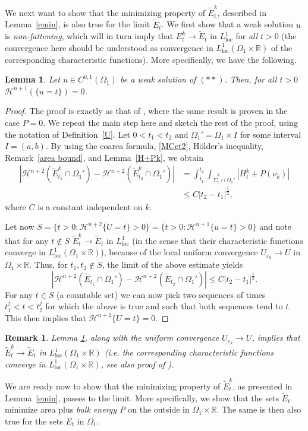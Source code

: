 \documentclass[11pt]{amsart}
\newtheorem{Lemma}[Theorem]{Lemma}
\newtheorem{Remark}[Theorem]{Remark}
\renewcommand{\epsilon}{\varepsilon}
\def\R{\mathbb{R}}
\def\e{\epsilon}
\def\H{\mathcal{H}}
\def\wt{\widetilde}
\def\loc{\text{loc}}
\begin{document}
We next want to show that the minimizing property of $\wt E_t^k$, described in Lemma~\ref{emin}, is also true for the limit $\wt E_t$. We first show that a weak solution $u$ is {\it non-fattening}, which will in turn imply that $E_t^k\to \wt E_t$ in $L^1_\loc$ for {\it all} $t>0$ (the convergence here should be understood as convergence in $L^1_\loc(\Omega_1\times\R)$ of the corresponding characteristic functions). More specifically, we have the following.
\begin{Lemma}\label{nonfat} Let $u\in C^{0,1}(\Omega_1)$ be a weak solution of $(**)$. Then, for all $t>0$ $\H^{n+1}(\{u=t\})=0$.
\end{Lemma}
\begin{proof}
The proof is exactly as that of \cite[Lemma 5.5]{S08}, where the same result is proven in the case $P=0$. We repeat the main step here and sketch the rest of the proof, using the notation of Definition~\ref{U}. Let $0<t_1<t_2$ and $\Omega_1'=\Omega_1\times I$ for some interval $I=(a,b)$. By using the coarea formula, \eqref{MCet2}, H\"older's inequality, Remark~\ref{area bound}, and Lemma~\ref{H+Pk}, we obtain
\[\begin{split}
|\H^{n+2}(\wt E_{t_1}^k\cap\Omega_1')-\H^{n+2}(\wt E_{t_2}^k\cap\Omega_1')|&=\int_{t_1}^{t_2}\int_{\wt\Sigma^k_t\cap\Omega_1'}|H_t^k+P(\nu_k)|\\
&\le C|t_2-t_1|^\frac12,
\end{split}\]
where $C$ is a constant independent on $k$. 

Let now $S=\{t>0:\H^{n+2}\{U=t\}>0\}=\{t>0:\H^{n+1}\{u=t\}>0\}$ and note that for any $t\notin S$ $\wt E_t^k\to\wt E_t$ in $L^1_\loc$ (in the sense that their characteristic functions converge in $L^1_\loc(\Omega_1\times\R)$), because of the local uniform convergence $U_{\e_k}\to U$ in $\Omega_1\times\R$. Thus, for $t_1,t_2\notin S$, the limit of the above estimate yields
\[|\H^{n+2}(\wt E_{t_1}\cap\Omega_1')-\H^{n+2}(\wt E_{t_2}\cap\Omega_1')|\le C|t_2-t_1|^\frac12.\]
For any $t\in S$ (a countable set) we can now pick two sequences of times $t_1^j<t<t_2^j$ for which the above is true and such that both sequences  tend to $t$. This then implies that $\H^{n+2}\{U=t\}=0$.
\end{proof}

\begin{Remark}\label{setconv} Lemma  \ref{nonfat}, along with the uniform convergence $U_{\e_k}\to U$, implies that $\wt E_t^k\to \wt E_t$ in $L^1_\loc(\Omega_1\times\R)$ (i.e. the corresponding characteristic functions converge in $L^1_\loc(\Omega_1\times\R)$, see also proof of \cite[Lemma 5.5]{S08}).
\end{Remark}
We are ready now to show that the minimizing property of $\wt E^k_t$, as presented in  Lemma~\ref{emin}, passes to the limit. More specifically,  we  show  that the sets $\wt E_t$ minimize area plus {\it bulk energy P} on the outside in $\Omega_1\times\R$. The same is then also true for the sets $E_t$ in $\Omega_1$.  
\end{document}
